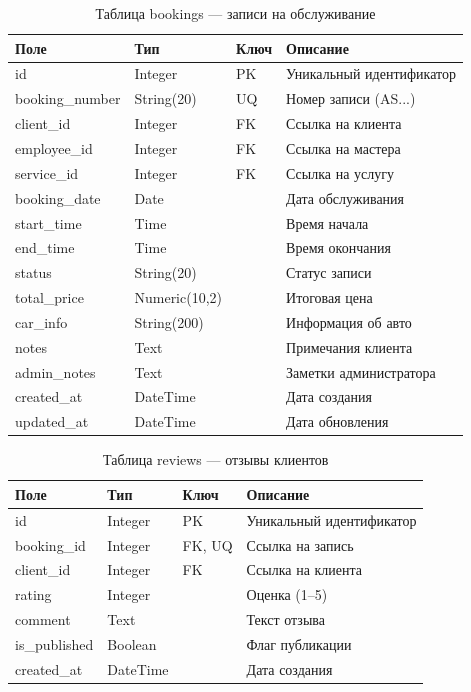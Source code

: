 \documentclass[14pt,a4paper,oneside]{extarticle}
\begin{document}
\begin{table}[H]
\caption{Таблица bookings --- записи на обслуживание}\label{tab:bookings}
\centering
\begin{tabularx}{\textwidth}{|l|l|l|X|}
\hline
\textbf{Поле} & \textbf{Тип} & \textbf{Ключ} & \textbf{Описание} \\
\hline
id & Integer & PK & Уникальный идентификатор \\
\hline
booking\_number & String(20) & UQ & Номер записи (AS...) \\
\hline
client\_id & Integer & FK & Ссылка на клиента \\
\hline
employee\_id & Integer & FK & Ссылка на мастера \\
\hline
service\_id & Integer & FK & Ссылка на услугу \\
\hline
booking\_date & Date & & Дата обслуживания \\
\hline
start\_time & Time & & Время начала \\
\hline
end\_time & Time & & Время окончания \\
\hline
status & String(20) & & Статус записи \\
\hline
total\_price & Numeric(10,2) & & Итоговая цена \\
\hline
car\_info & String(200) & & Информация об авто \\
\hline
notes & Text & & Примечания клиента \\
\hline
admin\_notes & Text & & Заметки администратора \\
\hline
created\_at & DateTime & & Дата создания \\
\hline
updated\_at & DateTime & & Дата обновления \\
\hline
\end{tabularx}
\end{table}

\begin{table}[H]
\caption{Таблица reviews --- отзывы клиентов}\label{tab:reviews}
\centering
\begin{tabularx}{\textwidth}{|l|l|l|X|}
\hline
\textbf{Поле} & \textbf{Тип} & \textbf{Ключ} & \textbf{Описание} \\
\hline
id & Integer & PK & Уникальный идентификатор \\
\hline
booking\_id & Integer & FK, UQ & Ссылка на запись \\
\hline
client\_id & Integer & FK & Ссылка на клиента \\
\hline
rating & Integer & & Оценка (1--5) \\
\hline
comment & Text & & Текст отзыва \\
\hline
is\_published & Boolean & & Флаг публикации \\
\hline
created\_at & DateTime & & Дата создания \\
\hline
\end{tabularx}
\end{table}
\end{document}

